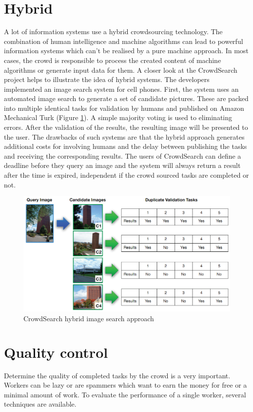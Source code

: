 \section{Hybrid}
A lot of information systems use a hybrid crowdsourcing technology. The combination of human intelligence and machine algorithms can lead to powerful information systems which can't be realised by a pure machine approach. In most cases, the crowd is responsible to process the created content of machine algorithms or generate input data for them. 
A closer look at the CrowdSearch \cite{crowdsearch} project helps to illustrate the idea of hybrid systems. The developers implemented an image search system for cell phones. First, the system uses an automated image search to generate a set of candidate pictures. These are packed into multiple identical tasks for validation by humans and published on Amazon Mechanical Turk (Figure \ref{crowdsearch}). A simple majority voting is used to eliminating errors. After the validation of the results, the resulting image will be presented to the user. The drawbacks of such systems are that the hybrid approach generates additional costs for involving humans and the delay between publishing the tasks and receiving the corresponding results. The users of CrowdSearch can define a deadline before they query an image and the system will always return a result after the time is expired, independent if the crowd sourced tasks are completed or not. 
\begin{figure}
\centering
\includegraphics[scale=0.35]{images/crowdsearch_hybrid.png}
\caption{CrowdSearch hybrid image search approach}
\label{crowdsearch}
\end{figure}

\section{Quality control}
Determine the quality of completed tasks by the crowd is a very important. Workers can be lazy or are spammers which want to earn the money for free or a minimal amount of work. To evaluate the performance of a single worker, several techniques are available. 
